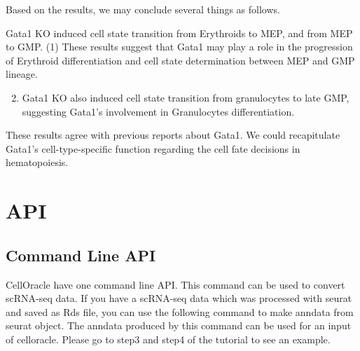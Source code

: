 \documentclass[letterpaper,10pt,english]{sphinxmanual}
\begin{document}
Based on the results, we may conclude several things as follows.

Gata1 KO induced cell state transition from Erythroids to MEP, and from MEP to GMP. (1) These results suggest that Gata1 may play a role in the progression of Erythroid differentiation and cell state determination between MEP and GMP lineage.
\begin{enumerate}
\setcounter{enumi}{1}
\item {} 
Gata1 KO also induced cell state transition from granulocytes to late GMP, suggesting Gata1’s involvement in Granulocytes differentiation.

\end{enumerate}

These results agree with previous reports about Gata1. We could recapitulate Gata1’s cell-type-specific function regarding the cell fate decisions in hematopoiesis.

{
%
\begin{sphinxVerbatim}[commandchars=\\\{\}]
\llap{\color{nbsphinxin}[ ]:\,\hspace{\fboxrule}\hspace{\fboxsep}}
\end{sphinxVerbatim}
}


\section{API}
\label{\detokenize{modules/index:api}}\label{\detokenize{modules/index::doc}}

\subsection{Command Line API}
\label{\detokenize{modules/index:command-line-api}}
CellOracle have one command line API. This command can be used to convert scRNA-seq data.
If you have a scRNA-seq data which was processed with seurat and saved as Rds file, you can use the following command to make anndata from seurat object.
The anndata produced by this command can be used for an input of celloracle. Please go to step3 and step4 of the tutorial to see an example.

%
\begin{sphinxVerbatim}[commandchars=\\\{\}]
  
\end{sphinxVerbatim}
\end{document}
